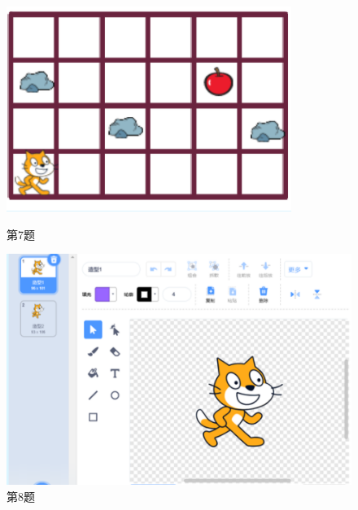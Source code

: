 \documentclass[10pt, a4paper]{article}
\begin{document}
\begin{enumerate}
        \begin{figure}[htbp]
            \centering
            \begin{minipage}[t]{.2\textwidth}
                \centering
                \includegraphics[width=\textwidth]{7.png}
                \caption*{第7题}
            \end{minipage}
            \begin{minipage}[t]{.21\textwidth}
                \centering
                \includegraphics[width=\textwidth]{8.png}
                \caption*{第8题}
            \end{minipage}
            \begin{minipage}[t]{.2\textwidth}
                \centering

\end{minipage}
\end{figure}
\end{enumerate}
\end{document}
